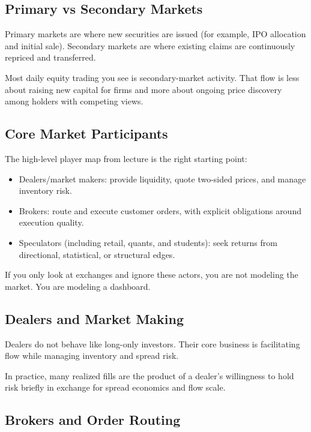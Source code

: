 \subsection{Primary vs Secondary Markets}

Primary markets are where new securities are issued (for example, IPO allocation and initial sale). Secondary markets are where existing claims are continuously repriced and transferred.

Most daily equity trading you see is secondary-market activity. That flow is less about raising new capital for firms and more about ongoing price discovery among holders with competing views.

\subsection{Core Market Participants}

The high-level player map from lecture is the right starting point:

\begin{itemize}
	\item Dealers/market makers: provide liquidity, quote two-sided prices, and manage inventory risk.
	\item Brokers: route and execute customer orders, with explicit obligations around execution quality.
	\item Speculators (including retail, quants, and students): seek returns from directional, statistical, or structural edges.
\end{itemize}

If you only look at exchanges and ignore these actors, you are not modeling the market. You are modeling a dashboard.

\subsection{Dealers and Market Making}

Dealers do not behave like long-only investors. Their core business is facilitating flow while managing inventory and spread risk.

In practice, many realized fills are the product of a dealer's willingness to hold risk briefly in exchange for spread economics and flow scale.

\subsection{Brokers and Order Routing}


